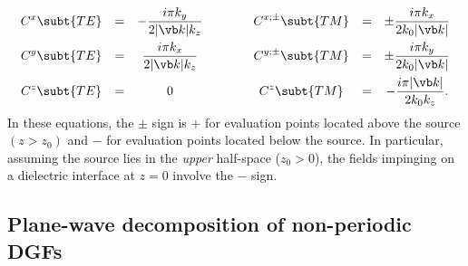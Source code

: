 \documentclass[letterpaper]{article}
\begin{document}
$$\begin{array}{ccccccc}
 \displaystyle{ C^{x}\subt{TE} }
 &=& 
  \displaystyle{ -\frac{ i \pi k_y}{2|\vb k|k_z} }
 &\qquad&
 \displaystyle{ C^{x;\pm}\subt{TM} }
 &=& 
 \displaystyle{ \pm \frac{ i \pi k_x }{2k_0|\vb k|} }
\\[10pt]
 \displaystyle{ C^{y}\subt{TE} }
 &=& 
  \displaystyle{ \frac{ i \pi k_x}{2|\vb k|k_z} }
 &\qquad&
 \displaystyle{ C^{y;\pm}\subt{TM} }
 &=& 
 \displaystyle{ \pm \frac{ i \pi k_y }{2k_0|\vb k|} }
\\[10pt]
 \displaystyle{ C^{z}\subt{TE} }
 &=& 0
 &\qquad&
 \displaystyle{ C^{z}\subt{TM} }
 &=& \displaystyle{ -\frac{ i\pi |\vb k|  }{2k_0 k_z} }.
\end{array}$$
In these equations, the $\pm$ sign is $+$ for evaluation points 
located above the source $(z>z_0)$ and $-$ for evaluation points
located below the source. In particular, assuming the 
source lies in the \textit{upper} half-space ($z_0>0$), 
the fields impinging on a dielectric interface at $z=0$
involve the $-$ sign.

\subsection{Plane-wave decomposition of non-periodic DGFs}
\end{document}
